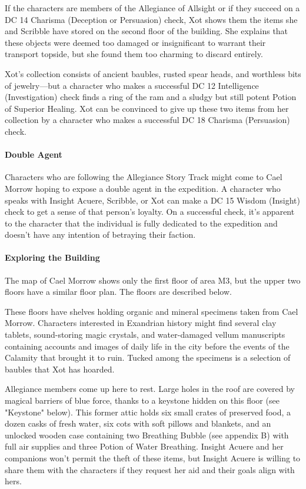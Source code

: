 \documentclass[10pt,a4paper,twoside,twocolumn,openany,nodeprecatedcode]{dndbook}
\begin{document}
If the characters are members of the Allegiance of Allsight or if they succeed on a DC 14 Charisma (Deception or Persuasion) check, Xot shows them the items she and Scribble have stored on the second floor of the building. She explains that these objects were deemed too damaged or insignificant to warrant their transport topside, but she found them too charming to discard entirely.

Xot's collection consists of ancient baubles, rusted spear heads, and worthless bits of jewelry—but a character who makes a successful DC 12 Intelligence (Investigation) check finds a ring of the ram and a sludgy but still potent Potion of Superior Healing. Xot can be convinced to give up these two items from her collection by a character who makes a successful DC 18 Charisma (Persuasion) check.

\paragraph{Double Agent}
Characters who are following the Allegiance Story Track might come to Cael Morrow hoping to expose a double agent in the expedition. A character who speaks with Insight Acuere, Scribble, or Xot can make a DC 15 Wisdom (Insight) check to get a sense of that person's loyalty. On a successful check, it's apparent to the character that the individual is fully dedicated to the expedition and doesn't have any intention of betraying their faction.

\paragraph{Exploring the Building}
The map of Cael Morrow shows only the first floor of area M3, but the upper two floors have a similar floor plan. The floors are described below.


\begin{description}[nolistsep]
\item[First and Second Floors.]
These floors have shelves holding organic and mineral specimens taken from Cael Morrow. Characters interested in Exandrian history might find several clay tablets, sound-storing magic crystals, and water-damaged vellum manuscripts containing accounts and images of daily life in the city before the events of the Calamity that brought it to ruin. Tucked among the specimens is a selection of baubles that Xot has hoarded.
\item[Third Floor.]
Allegiance members come up here to rest. Large holes in the roof are covered by magical barriers of blue force, thanks to a keystone hidden on this floor (see "Keystone" below). This former attic holds six small crates of preserved food, a dozen casks of fresh water, six cots with soft pillows and blankets, and an unlocked wooden case containing two Breathing Bubble (see appendix B) with full air supplies and three Potion of Water Breathing. Insight Acuere and her companions won't permit the theft of these items, but Insight Acuere is willing to share them with the characters if they request her aid and their goals align with hers.
\end{description}
\end{document}

